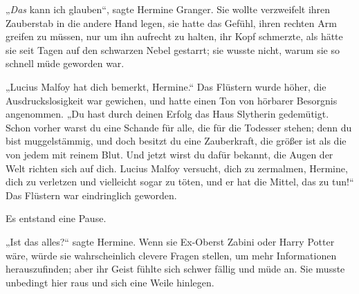 „\emph{Das} kann ich glauben“, sagte Hermine Granger. Sie wollte verzweifelt ihren Zauberstab in die andere Hand legen, sie hatte das Gefühl, ihren rechten Arm greifen zu müssen, nur um ihn aufrecht zu halten, ihr Kopf schmerzte, als hätte sie seit Tagen auf den schwarzen Nebel gestarrt; sie wusste nicht, warum sie so schnell müde geworden war.

„Lucius Malfoy hat dich bemerkt, Hermine.“ Das Flüstern wurde höher, die Ausdruckslosigkeit war gewichen, und hatte einen Ton von hörbarer Besorgnis angenommen. „Du hast durch deinen Erfolg das Haus Slytherin gedemütigt. Schon vorher warst du eine Schande für alle, die für die Todesser stehen; denn du bist muggelstämmig, und doch besitzt du eine Zauberkraft, die größer ist als die von jedem mit reinem Blut. Und jetzt wirst du dafür bekannt, die Augen der Welt richten sich auf dich. Lucius Malfoy versucht, dich zu zermalmen, Hermine, dich zu verletzen und vielleicht sogar zu töten, und er hat die Mittel, das zu tun!“ Das Flüstern war eindringlich geworden.

Es entstand eine Pause.

„Ist das alles?“ sagte Hermine. Wenn sie Ex-Oberst Zabini oder Harry Potter wäre, würde sie wahrscheinlich clevere Fragen stellen, um mehr Informationen herauszufinden; aber ihr Geist fühlte sich schwer fällig und müde an. Sie musste unbedingt hier raus und sich eine Weile hinlegen.


